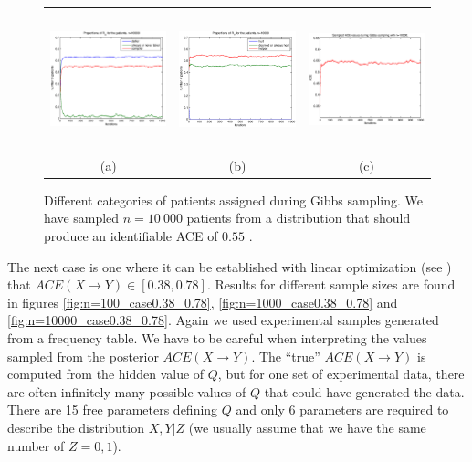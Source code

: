 \documentclass[a4paper, 10pt]{article}
\begin{document}
\begin{figure}
\begin{tabular}{ccc}
 \includegraphics[width=4.5cm,height=4cm,bb=103 240 500
555]{takingtype_case0.55_n=10000.eps} &
 \includegraphics[width=4.5cm,height=4cm,bb=103 240 500 555]
{healingtype_case0.55_n=10000.eps} &
 \includegraphics[width=4.5cm,height=4cm,bb=103 240
500 555]{sampledACEs_case0.55_n=10000.eps} \\
(a) & (b) & (c)
\end{tabular}
\caption{Different categories of patients assigned during Gibbs sampling. We
have sampled $n=10\ 000$ patients from a distribution that should produce an
identifiable ACE of $0.55$ .}
\label{fig:n=10000_case0.55}
\end{figure}

The next case is one where it can be established with linear optimization (see
\cite{pearl2000cmr}) that $ACE(X\rightarrow Y) \in [0.38, 0.78]$. Results for
different sample sizes are found in figures
\ref{fig:n=100_case0.38_0.78}, \ref{fig:n=1000_case0.38_0.78} and
\ref{fig:n=10000_case0.38_0.78}. Again we used
experimental samples generated from a frequency table. We have to be careful
when interpreting the values sampled from the posterior $ACE(X\rightarrow Y)$.
The ``true'' $ACE(X\rightarrow Y)$ is computed from the hidden value of $Q$, but
for one set of experimental data, there are often infinitely many possible
values of $Q$ that could have generated the data. There are 15 free
parameters defining $Q$ and only 6 parameters are required to describe the
distribution $X,Y|Z$ (we usually assume that we have the same number of
$Z=0,1$).
\end{document}
